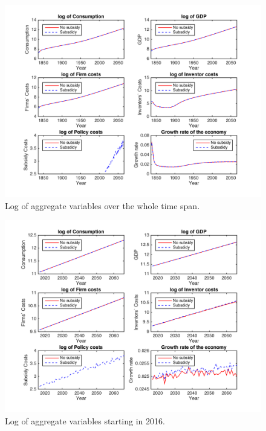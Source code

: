 \documentclass[a4paper,11pt]{article}
\begin{document}
\begin{figure}[h!]
\centering
\includegraphics[scale=.6]{figures/aggregatesNT}
\caption{Log of aggregate variables over the whole time span.}
\end{figure}

\begin{figure}[h!]
\centering
\includegraphics[scale=.6]{figures/aggregates2016NT}
\caption{Log of aggregate variables starting in 2016.}
\end{figure}
\end{document}
